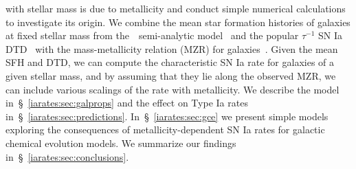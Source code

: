with stellar mass is due to metallicity and conduct simple numerical
calculations to investigate its origin.
We combine the mean star formation histories of galaxies at fixed stellar
mass from the~\um~semi-analytic model~\citep{Behroozi2019} and the popular
$\tau^{-1}$ SN Ia DTD~\citep[e.g.,][]{Maoz2012a} with the mass-metallicity
relation (MZR) for galaxies~\citep{Tremonti2004, Andrews2013, Zahid2011,
Zahid2014}.
Given the mean SFH and DTD, we can compute the characteristic SN Ia rate for
galaxies of a given stellar mass, and by assuming that they lie along the
observed MZR, we can include various scalings of the rate with metallicity.
We describe the model in~\S~\ref{iarates:sec:galprops} and the effect on Type Ia rates
in~\S~\ref{iarates:sec:predictions}.
In~\S~\ref{iarates:sec:gce} we present simple models exploring the consequences of
metallicity-dependent SN Ia rates for galactic chemical evolution models.
We summarize our findings in~\S~\ref{iarates:sec:conclusions}.

